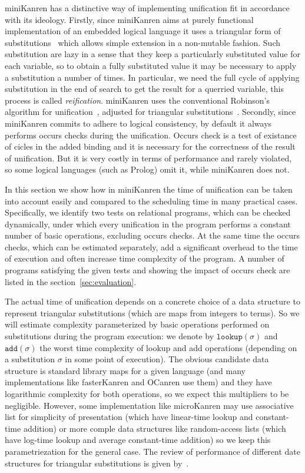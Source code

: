 \documentclass[acmsmall, anonymous, review]{acmart}
\newcommand{\sectionword}{section}
\newcommand{\mK}{miniKanren\xspace}
\newcommand{\lookuptime}[1]{\texttt{lookup}(#1)}
\newcommand{\addtime}[1]{\texttt{add}(#1)}
\begin{document}
\mK has a distinctive way of implementing unification fit in accordance with its ideology. Firstly, since \mK aims at purely functional implementation of an embedded logical language it uses a triangular form of substitutions~\cite{UnificationTheory} which allows simple extension in a non-mutable fashion. Such substitution are lazy in a sense that they keep a particularly substituted value for each variable, so to obtain a fully substituted value it may be necessary to apply a substitution a number of times. In particular, we need the full cycle of applying substitution in the end of search to get the result for a querried variable, this process is called \emph{reification}. \mK uses the conventional Robinson's algorithm for unification~\cite{UnificationTheory}, adjusted for triangular substitutions~\cite{TRS}. Secondly, since \mK commits to adhere to logical consistency, by default it always performs occurs checks during the unification. Occurs check is a test of existance of cicles in the added binding and it is necessary for the correctness of the result of unification. But it is very costly in terms of performance and rarely violated, so some logical languages (such as Prolog) omit it, while \mK does not.

In this section we show how in \mK the time of unification can be taken into account easily and compared to the scheduling time in many practical cases. Specifically, we identify two tests on relational programs, which can be checked dynamically, under which every unification in the program performs a constant number of basic operations, excluding occurs checks. At the same time the occurs checks, which can be estimated separately, add a significant overhead to the time of execution and often increase time complexity of the program. A number of programs satisfying the given tests and showing the impact of occurs check are listed in the \sectionword~\ref{sec:evaluation}.

The actual time of unification depends on a concrete choice of a data structure to represent triangular substitutions (which are maps from integers to terms). So we will estimate complexity parameterized by basic operations performed on substitutions during the program execution: we denote by $\lookuptime{\sigma}$ and $\addtime{\sigma}$ the worst time complexity of lookup and add operations (depending on a substitution $\sigma$ in some point of execution). The obvious candidate data structure is standard library maps for a given language (and many implementations like fasterKanren and OCanren use them) and they have logarithmic complexity for both operations, so we expect this multipliers to be negligible. However, some implementation like microKanren may use associative list for simplicity of presentation (which have linear-time lookup and constant-time addition) or more comple data structures like random-access lists (which have log-time lookup and average constant-time addition) so we keep this parametriezation for the general case. The review of performance of different date structures for triangular substitutions is given by~\citet{SubstDataStructs}.
\end{document}
